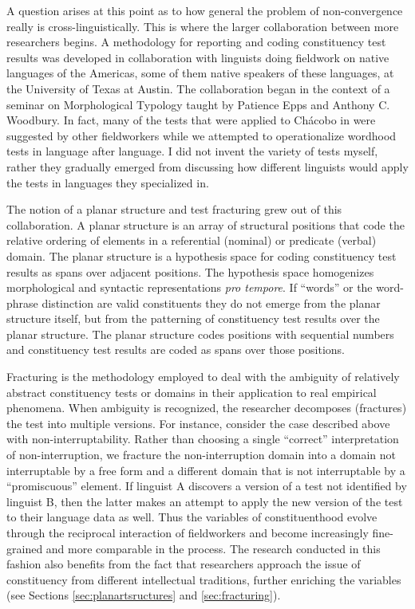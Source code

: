 \documentclass[output=paper,hidelinks]{langscibook}
\begin{document}
A question arises at this point as to how general the problem of non-conver\-gence really is cross-linguistically. This is where the larger collaboration between more researchers begins. A methodology for reporting and coding constituency test results was developed in collaboration with linguists doing fieldwork on native languages of the Americas, some of them native speakers of these languages, at the University of Texas at Austin. The collaboration began in the context of a seminar on Morphological Typology taught by Patience Epps and Anthony C. Woodbury. In fact, many of the tests that were applied to Chácobo in \citet{tallman2021constituency} were suggested by other fieldworkers while we attempted to operationalize wordhood tests in language after language. I did not invent the variety of tests myself, rather they gradually emerged from discussing how different linguists would apply the tests in languages they specialized in.

The notion of a planar structure and test fracturing grew out of this collaboration. A planar structure is an array of structural positions that code the relative ordering of elements in a referential (nominal) or predicate (verbal) domain. The planar structure is a hypothesis space for coding constituency test results as spans over adjacent positions. The hypothesis space homogenizes morphological  and syntactic representations \textit{pro tempore}. If ``words'' or the word-phrase distinction are valid constituents they do not emerge from the planar structure itself, but from the patterning of constituency test results over the planar structure. The planar structure codes positions with sequential numbers and constituency test results are coded as spans over those positions.

Fracturing is the methodology employed to deal with the ambiguity of relatively abstract constituency tests or domains in their application to real empirical phenomena. When ambiguity is recognized, the researcher decomposes (fractures) the test into multiple versions. For instance, consider the case described above with non-interruptability. Rather than choosing a single ``correct'' interpretation of non-interruption, we fracture the non-interruption domain into a domain not interruptable by a free form and a different domain that is not interruptable by a ``promiscuous'' element. If linguist A discovers a version of a test not identified by linguist B, then the latter makes an attempt to apply the new version of the test to their language data as well. Thus the variables of constituenthood evolve through the reciprocal interaction of fieldworkers and become increasingly fine-grained and more comparable in the process. The research conducted in this fashion also benefits from the fact that researchers approach the issue of constituency from different intellectual traditions, further enriching the variables (see Sections \ref{sec:planartsructures} and \ref{sec:fracturing}).
\end{document}
